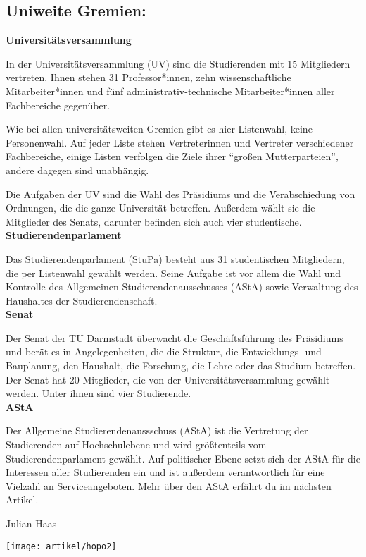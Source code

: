{    \subsection*{Uniweite Gremien:}
    \noindent\textbf{Universitätsversammlung}

    In der Universitätsversammlung (UV) sind die Studierenden mit 15 Mitgliedern vertreten. Ihnen stehen 31 Professor*innen, zehn wissenschaftliche Mitarbeiter*innen und  fünf administrativ-technische Mitarbeiter*innen aller Fachbereiche gegenüber.

    \noindent Wie bei allen universitätsweiten Gremien gibt es hier Listenwahl, keine Personenwahl. Auf jeder Liste stehen Vertreterinnen und Vertreter verschiedener Fachbereiche, einige Listen verfolgen die Ziele ihrer "`großen Mutterparteien"', andere dagegen sind unabhängig.

    Die Aufgaben der UV sind die Wahl des Präsidiums und die Verabschiedung von Ordnungen, die die ganze Universität betreffen. Außerdem wählt sie die Mitglieder des Senats, darunter befinden sich auch vier studentische.\\

    \noindent\textbf{Studierendenparlament}

    Das Studierendenparlament (StuPa) besteht aus 31 studentischen Mitgliedern, die per Listenwahl gewählt werden. Seine Aufgabe ist vor allem die Wahl und Kontrolle des Allgemeinen Studierendenausschusses (AStA) sowie Verwaltung des Haushaltes der Studierendenschaft.\\

    \noindent\textbf{Senat}

    Der Senat der TU Darmstadt überwacht die Geschäftsführung des Präsidiums und berät es in Angelegenheiten, die die Struktur, die Entwicklungs- und Bauplanung, den Haushalt, die Forschung, die Lehre oder das Studium betreffen. Der Senat hat 20 Mitglieder, die von der Universitätsversammlung gewählt werden. Unter ihnen sind vier Studierende.\\

    \noindent\textbf{AStA}

    Der Allgemeine Studierendenaussschuss (AStA) ist die Vertretung der Studierenden auf Hochschulebene und wird größtenteils vom Studierendenparlament gewählt.
    Auf politischer Ebene setzt sich der AStA für die Interessen aller Studierenden ein und ist außerdem verantwortlich für eine Vielzahl an Serviceangeboten.
    Mehr über den AStA erfährt du im nächsten Artikel.

}
{Julian Haas}


\texttt{[image: artikel/hopo2]}

\newpage
